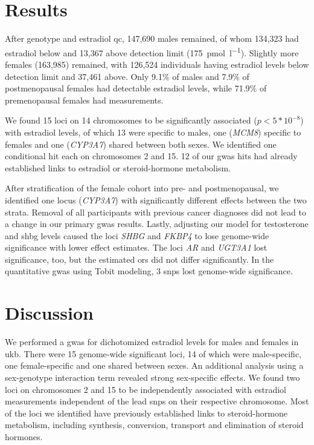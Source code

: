\documentclass[draft]{scrbook}
\begin{document}
\section{Results}

After genotype and estradiol \gls{qc}, 147,690 males remained, of whom 134,323 had estradiol below and 13,367 above detection limit (\qty{175}{\pmol\per\l}).
Slightly more females (163,985) remained, with 126,524 individuals having estradiol levels below detection limit and 37,461 above.
Only 9.1\% of males and 7.9\% of postmenopausal females had detectable estradiol levels, while 71.9\% of premenopausal females had measurements.

We found 15 loci on 14 chromosomes to be significantly associated ($p < 5*10^{-8}$) with estradiol levels, of which 13 were specific to males, one (\textit{MCM8}) specific to females and one (\textit{CYP3A7}) shared between both sexes.
We identified one conditional hit each on chromosomes 2 and 15.
12 of our \gls{gwas} hits had already established links to estradiol or steroid-hormone metabolism.

After stratification of the female cohort into pre- and postmenopausal, we identified one locus (\textit{CYP3A7}) with significantly different effects between the two strata.
Removal of all participants with previous cancer diagnoses did not lead to a change in our primary \gls{gwas} results.
Lastly, adjusting our model for testosterone and \gls{shbg} levels caused the loci \textit{SHBG} and \textit{FKBP4} to lose genome-wide significance with lower effect estimates.
The loci \textit{AR} and \textit{UGT3A1} lost significance, too, but the estimated \glspl{or} did not differ significantly.
In the quantitative \gls{gwas} using Tobit modeling, 3 \glspl{snp} lost genome-wide significance.

\section{Discussion} \label{sec:p1discussion}
We performed a \gls{gwas} for dichotomized estradiol levels for males and females in \gls{ukb}.
There were 15 genome-wide significant loci, 14 of which were male-specific, one female-specific and one shared between sexes.
An additional analysis using a sex-genotype interaction term revealed strong sex-specific effects.
We found two loci on chromosomes 2 and 15 to be independently associated with estradiol measurements independent of the lead \glspl{snp} on their respective chromosome.
Most of the loci we identified have previously established links to steroid-hormone metabolism, including synthesis, conversion, transport and elimination of steroid hormones.
\end{document}
